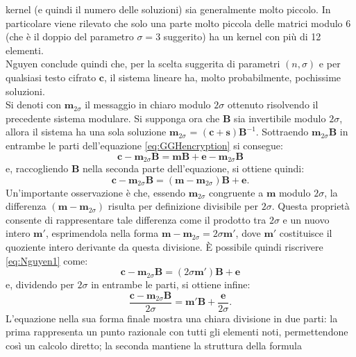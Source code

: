 kernel (e quindi il numero delle soluzioni) sia generalmente molto piccolo. In particolare
viene rilevato che solo una parte molto piccola delle matrici modulo 6 (che è il doppio del 
parametro $\sigma = 3$ suggerito) ha un kernel con più di 12 elementi. \\
Nguyen conclude quindi che, per la scelta suggerita di parametri $(n, \sigma)$ e per qualsiasi 
testo cifrato $\mathbf{c}$, il sistema lineare ha, molto probabilmente, pochissime soluzioni. \\
Si denoti con $\mathbf{m}_{2\sigma}$ il messaggio in chiaro modulo $2\sigma$ ottenuto 
risolvendo il precedente sistema modulare. Si supponga ora che $\mathbf{B}$ sia invertibile
modulo $2\sigma$, allora il sistema ha una sola soluzione 
$\mathbf{m}_{2\sigma}$ = $(\mathbf{c} + \mathbf{s})\mathbf{B}^{-1}$. Sottraendo $\mathbf{m}_{2\sigma}\mathbf{B}$ 
in entrambe le parti dell'equazione \ref{eq:GGHencryption} si consegue:
\[
    \mathbf{c} - \mathbf{m}_{2\sigma}\mathbf{B} = \mathbf{m}\mathbf{B} + \mathbf{e} - \mathbf{m}_{2\sigma}\mathbf{B}
\]
e, raccogliendo $\mathbf{B}$ nella seconda parte dell'equazione, si ottiene quindi:
\begin{equation}
    \label{eq:Nguyen1}
    \mathbf{c} - \mathbf{m}_{2\sigma}\mathbf{B} = (\mathbf{m} - \mathbf{m}_{2\sigma})\mathbf{B} + \mathbf{e}.
\end{equation}
Un'importante osservazione è che, essendo $\mathbf{m}_{2\sigma}$ congruente a $\mathbf{m}$ 
modulo $2\sigma$, la differenza $(\mathbf{m} - \mathbf{m}_{2\sigma})$ risulta per definizione 
divisibile per $2\sigma$. Questa proprietà consente di rappresentare tale differenza 
come il prodotto tra $2\sigma$ e un nuovo intero $\mathbf{m}'$, esprimendola nella 
forma $\mathbf{m} - \mathbf{m}_{2\sigma} = 2\sigma\mathbf{m}'$, dove $\mathbf{m}'$ 
costituisce il quoziente intero derivante da questa divisione. È possibile quindi riscrivere
\ref{eq:Nguyen1} come:
\[
    \mathbf{c} - \mathbf{m}_{2\sigma}\mathbf{B} = (2\sigma\mathbf{m}')\mathbf{B} + \mathbf{e}
\]
e, dividendo per $2\sigma$ in entrambe le parti, si ottiene infine:
\begin{equation}
    \label{eq:Nguyen2}
    \frac{\mathbf{c} - \mathbf{m}_{2\sigma}\mathbf{B}}{2\sigma} = \mathbf{m}'\mathbf{B} + \frac{\mathbf{e}}{2\sigma}. 
\end{equation}
L'equazione  nella sua forma finale mostra una chiara divisione in due 
parti: la prima rappresenta un punto razionale con tutti gli elementi noti, 
permettendone così un calcolo diretto; la seconda mantiene la struttura della formula 

